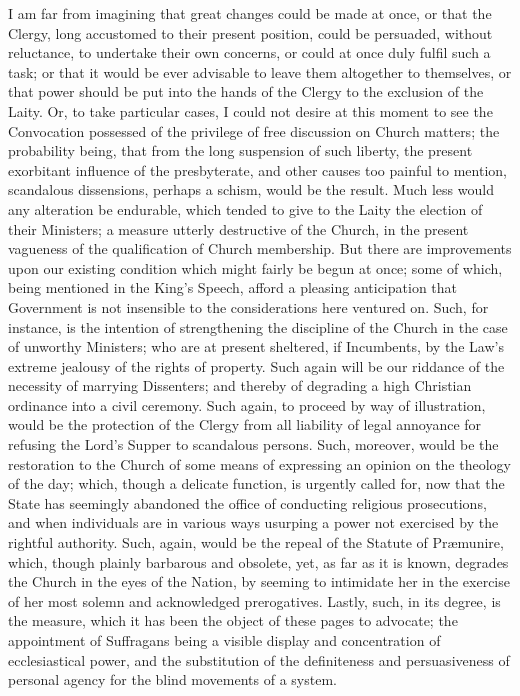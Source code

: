 I am far from imagining that great changes could
be made at once, or that the Clergy, long accustomed to their present
position, could be persuaded, without reluctance, to undertake their
own concerns, or could at once duly fulfil such a task; or that it
would be ever advisable to leave them altogether to themselves, or
that power should be put into the hands of the Clergy to the exclusion
of the Laity. Or, to take particular cases, I could not desire at this
moment to see the Convocation possessed of the privilege of free
discussion on Church matters; the probability being, that from the
long suspension of such liberty, the present exorbitant influence of
the presbyterate, and other causes too painful to mention, scandalous
dissensions, perhaps a schism, would be the result. Much less would
any alteration be endurable, which tended to give to the Laity the
election of their Ministers; a measure utterly destructive of the
Church, in the present vagueness of the qualification of Church
membership. But there are improvements upon our existing condition
which might fairly be begun at once; some of which, being mentioned in
the King's Speech, afford a pleasing anticipation that Government is
not insensible to the considerations here ventured on. Such, for
instance, is the intention of strengthening the discipline of the
Church in the case of unworthy Ministers; who are at present
sheltered, if Incumbents, by the Law's extreme jealousy of the rights
of property. Such again will be our riddance of the necessity of
marrying Dissenters; and thereby of degrading a high Christian
ordinance into a civil ceremony. Such again, to proceed by way of
illustration, would be the protection of the Clergy from all liability
of legal annoyance for refusing the Lord's Supper to scandalous
persons. Such, moreover, would be the restoration to the Church of
some means of expressing an opinion on the theology of the day; which,
though a delicate function, is urgently called for, now that the State
has seemingly abandoned the office of conducting religious
prosecutions, and when individuals are in various ways usurping a
power not exercised by the rightful authority. Such, again, would be
the repeal of the Statute of Præmunire, which, though plainly
barbarous and obsolete, yet, as far as it is known, degrades the
Church in the eyes of the Nation, by seeming to intimidate her in the
exercise of her most solemn and acknowledged prerogatives. Lastly,
such, in its degree, is the measure, which it has been the object of
these pages to advocate; the appointment of Suffragans being a visible
display and concentration of ecclesiastical power, and the
substitution of the definiteness and persuasiveness of personal agency
for the blind movements of a system.


